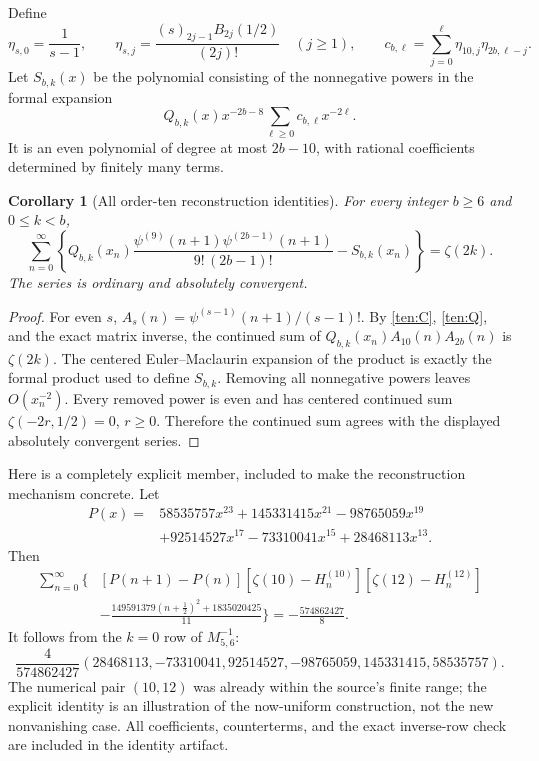 \documentclass[11pt]{article}
\newtheorem{corollary}[theorem]{Corollary}
\theoremstyle{definition}
\theoremstyle{remark}
\numberwithin{equation}{section}
\begin{document}
Define
\[
 \eta_{s,0}=\frac1{s-1},\qquad
 \eta_{s,j}=\frac{(s)_{2j-1}B_{2j}(1/2)}{(2j)!}\quad(j\ge1),
 \qquad c_{b,\ell}=\sum_{j=0}^{\ell}\eta_{10,j}\eta_{2b,\ell-j}.
\]
Let $S_{b,k}(x)$ be the polynomial consisting of the nonnegative
powers in the formal expansion
\[
 Q_{b,k}(x)x^{-2b-8}\sum_{\ell\ge0}c_{b,\ell}x^{-2\ell}.
\]
It is an even polynomial of degree at most $2b-10$, with rational
coefficients determined by finitely many terms.

\begin{corollary}[All order-ten reconstruction identities]
\label{ten:identity}
For every integer $b\ge6$ and $0\le k<b$,
\begin{equation}\label{ten:polygamma}
 \boxed{\displaystyle
 \sum_{n=0}^{\infty}\left\{
 Q_{b,k}(x_n)
 \frac{\psi^{(9)}(n+1)\psi^{(2b-1)}(n+1)}{9!\,(2b-1)!}
             -S_{b,k}(x_n)\right\}=\zeta(2k).}
\end{equation}
The series is ordinary and absolutely convergent.
\end{corollary}
\begin{proof}
For even $s$, $A_s(n)=\psi^{(s-1)}(n+1)/(s-1)!$.
By \eqref{ten:C}, \eqref{ten:Q}, and the exact matrix inverse,
the continued sum of $Q_{b,k}(x_n)A_{10}(n)A_{2b}(n)$ is
$\zeta(2k)$.  The centered Euler--Maclaurin expansion of the product
is exactly the formal product used to define $S_{b,k}$.
Removing all nonnegative powers leaves $O(x_n^{-2})$.
Every removed power is even and has centered continued sum
$\zeta(-2r,1/2)=0$, $r\ge0$.  Therefore the continued sum agrees
with the displayed absolutely convergent series.
\end{proof}

Here is a completely explicit member, included to make the
reconstruction mechanism concrete.  Let
\begin{align*}
 P(x)={}&58535757x^{23}+145331415x^{21}-98765059x^{19}\\
        &+92514527x^{17}-73310041x^{15}+28468113x^{13}.
\end{align*}
Then
\begin{equation}\label{ten:explicitidentity}
 \begin{split}
 \sum_{n=0}^{\infty}\Bigg\{&
    [P(n+1)-P(n)]
        [\zeta(10)-H_n^{(10)}][\zeta(12)-H_n^{(12)}]\\
   &-\frac{149591379(n+\tfrac12)^2+1835020425}{11}
                          \Bigg\}
       =-\frac{574862427}{8}.
 \end{split}
\end{equation}
It follows from the $k=0$ row of $M_{5,6}^{-1}$:
\[
 \frac4{574862427}
 (28468113,-73310041,92514527,-98765059,145331415,58535757).
\]
The numerical pair $(10,12)$ was already within the source's finite
range; the explicit identity is an illustration of the now-uniform
construction, not the new nonvanishing case.  All coefficients,
counterterms, and the exact inverse-row check are included in the
identity artifact.
\end{document}
